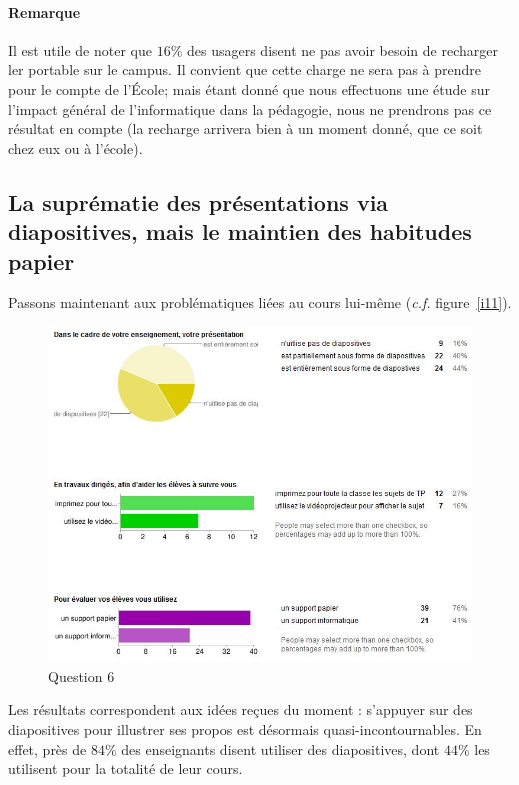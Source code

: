\documentclass[a4paper,11pt,french]{report}
\begin{document}
\paragraph{Remarque}
Il est utile de noter que $16\%$ des usagers disent ne pas avoir besoin de recharger ler portable sur le campus. Il convient que cette charge ne sera pas à prendre pour le compte de l'École; mais étant donné que nous effectuons une étude sur l'impact général de l'informatique dans la pédagogie, nous ne prendrons pas ce résultat en compte (la recharge arrivera bien à un moment donné, que ce soit chez eux ou à l'école).\\


\subsection[Quelles suprématies ?]{La suprématie des présentations via diapositives, mais le maintien des habitudes papier}

Passons maintenant aux problématiques liées au cours lui-même (\textit{c.f.} figure~\vref{i11}).\\

\begin{figure}[h!]
\includegraphics[width=\textwidth]{i11.JPG}
\caption{Question 6}
\label{i11}
\end{figure}

Les résultats correspondent aux idées reçues du moment : s'appuyer sur des diapositives pour illustrer ses propos est désormais quasi-incontournables. En effet, près de $84\%$ des enseignants disent utiliser des diapositives, dont $44\%$ les utilisent pour la totalité de leur cours.\\
\end{document}

